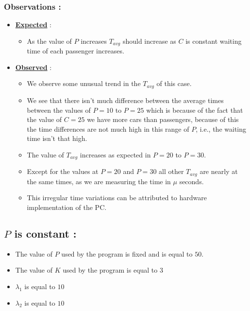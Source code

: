 \documentclass[12pt,a4paper]{article}
\begin{document}
	\subsubsection{Observations :}
	\begin{itemize}
		\item \underline{\textbf{Expected}} : 
		\begin{itemize}
			\item As the value of $P$ increases $T_{avg}$ should increase as $C$ is constant waiting time of each passenger increases.
		\end{itemize}
		\item \underline{\textbf{Observed}} : 
		\begin{itemize}
			\item We observe some unusual trend in the $T_{avg}$ of this case.
			\item We see that there isn't much difference between the average times between the values of $P=10$ to $P=25$ which is because of the fact that the value of $C=25$ we have more cars than passengers, because of this the time differences are not much high in this range of $P$, i.e., the waiting time isn't that high.
			\item The value of $T_{avg}$ increases as expected in $P=20$ to $P=30$.
			\item Except for the values at $P=20$ and $P=30$ all other $T_{avg}$ are nearly at the same times, as we are measuring the time in $\mu$ seconds.
			\item This irregular time variations can be attributed to hardware implementation of the PC.
		\end{itemize}
	\end{itemize}
	
	\subsection{$P$ is constant :}
	\begin{itemize}
	\item The value of $P$ used by the program is fixed and is equal to $50$.
	\item The value of $K$ used by the program is equal to $3$
	\item $\lambda _1$ is equal to $10$
	\item $\lambda _2$ is equal to $10$
\end{itemize}
\end{document}
